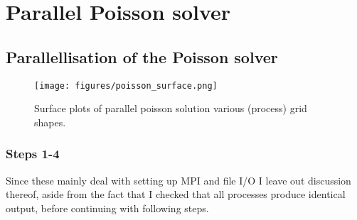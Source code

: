 \section{Parallel Poisson solver}

\subsection{Parallellisation of the Poisson solver}
\begin{figure}[H]
    \centering
    \texttt{[image: figures/poisson\_surface.png]}
    \caption{Surface plots of parallel poisson solution various (process) grid shapes.}
    \label{fig:ppoisson_surface}
\end{figure}

\subsubsection{Steps 1-4}
Since these mainly deal with setting up MPI and file I/O I leave out discussion thereof, aside from the fact that 
I checked that all processes produce identical output, before continuing with following steps. 

